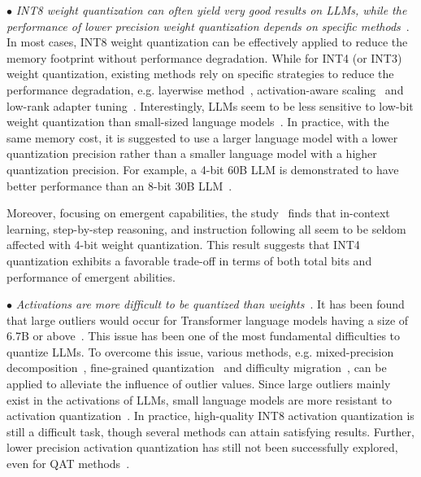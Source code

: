 {$\bullet$ \emph{INT8 weight quantization can often yield very good results on LLMs, while the performance of lower precision weight quantization depends on specific  methods}~\cite{Yao-CoRR-2023-ZeroQuant-V2,Xiao-CoRR-2022-SmoothQuant,frantar-arxiv-2022-gptq,Lin-arXiv-2023-AWQ}.  In most cases, INT8 weight quantization can be effectively applied to reduce the memory footprint without performance degradation. While for INT4 (or INT3) weight quantization, existing methods rely on specific strategies to reduce the performance degradation, e.g. layerwise method~\cite{frantar-arxiv-2022-gptq,Yao-NeurlPS-2022-ZeroQuant}, activation-aware scaling~\cite{Lin-arXiv-2023-AWQ} and low-rank adapter tuning~\cite{Dettmers-CoRR-2023-QLoRA}. Interestingly, LLMs seem to be less sensitive to low-bit weight quantization than small-sized language models~\cite{Yao-CoRR-2023-ZeroQuant-V2}. In practice, with the same memory cost, it is suggested to use a larger language model with a lower quantization precision rather than a smaller language model with a higher quantization precision. For example, a 4-bit 60B LLM is demonstrated to have better performance than an 8-bit 30B LLM~\cite{Dettmers-2022-arxiv-case}. 

{Moreover, focusing on emergent capabilities, the study~\cite{Liu-2023-arxiv-Do_emergent} finds that in-context learning, step-by-step reasoning, and instruction following all seem to be seldom affected with 4-bit weight quantization. This result suggests that INT4 quantization exhibits a favorable trade-off in terms of both total bits and performance of emergent abilities.}

$\bullet$ \emph{Activations are more difficult to be quantized than weights}~\cite{Yao-CoRR-2023-ZeroQuant-V2,Dettmers-arxiv-2022-LLM,Xiao-CoRR-2022-SmoothQuant}. It has been found that large outliers would occur for Transformer language models having a size of 6.7B or above~\cite{Dettmers-arxiv-2022-LLM}. This issue has been one of the most fundamental difficulties to quantize LLMs. To overcome this issue, various methods, e.g. mixed-precision decomposition~\cite{Dettmers-arxiv-2022-LLM}, fine-grained  quantization~\cite{wei-arxiv-2023-zero,Dettmers-arxiv-2022-LLM} and difficulty migration~\cite{Xiao-CoRR-2022-SmoothQuant},   can be applied to alleviate the influence of outlier values. Since large outliers mainly exist in the activations of LLMs, small language models are more resistant to activation quantization~\cite{Yao-CoRR-2023-ZeroQuant-V2,Liu-2023-arxiv-Do_emergent}. {In practice, high-quality INT8 activation quantization is still a difficult task, though several methods can attain satisfying results. } Further, lower precision activation quantization has still not been successfully explored, even for QAT methods~\cite{liu-2023-arxiv-LLM-QAT}.  

}
